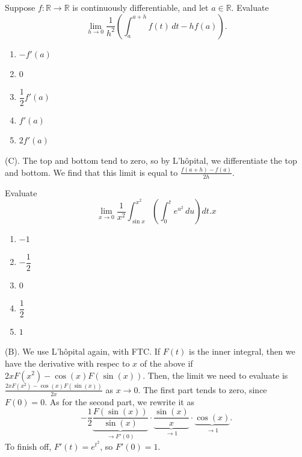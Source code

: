 \begin{exercise}
Suppose $f:\mathbb R\to\mathbb R$ is continuously differentiable, and let $a\in\mathbb R$. Evaluate
\[
\lim_{h\to0}\frac{1}{h^2}
\left(\int_a^{a+h}f(t)\,dt-hf(a)\right).
\]
\begin{enumerate}[label=(\Alph*)]
    \item $-f'(a)$
    \item $0$
    \item $\dfrac12 f'(a)$
    \item $f'(a)$
    \item $2f'(a)$
\end{enumerate}
\end{exercise}
\begin{solution}
(C). The top and bottom tend to zero, so by L'h\^{o}pital, we differentiate the top and bottom.
We find that this limit is equal to $\frac{f(a+h) - f(a)}{2h}$.
\end{solution}

\begin{exercise}
Evaluate
\[
\lim_{x\to0}\frac{1}{x^2}
\int_{\sin x}^{x^2}
\left(\int_0^t e^{u^2}\,du\right)dt.
x\]
\begin{enumerate}[label=(\Alph*)]
    \item $-1$
    \item $-\dfrac12$
    \item $0$
    \item $\dfrac12$
    \item $1$
\end{enumerate}
\end{exercise}
\begin{solution}
(B). We use L'h\^{o}pital again, with FTC. If $F(t)$ is the inner integral, then 
we have the derivative with respec to $x$ of the above if $2xF(x^2) - \cos(x)F(\sin(x))$.
Then, the limit we need to evaluate is $\frac{2xF(x^2) - \cos(x)F(\sin(x))}{2x}$ as $x \rightarrow 0$.
The first part tends to zero, since $F(0) = 0$. As for the second part, we rewrite it as 
\[
-\frac{1}{2}\underbrace{\frac{F(\sin(x))}{\sin(x)}}_{\rightarrow F'(0)}
\cdot \underbrace{\frac{\sin (x)}{x}}_{\rightarrow 1} \cdot \underbrace{\cos (x)}_{\rightarrow 1}.
\]
To finish off, $F'(t) = e^{t^2}$, so $F'(0) = 1$.
\end{solution}

